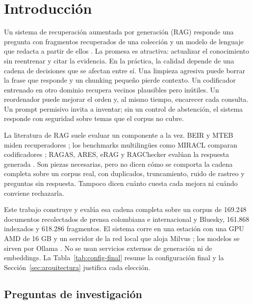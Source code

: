 \section{Introducci\'on}
\label{sec:intro}

Un sistema de recuperaci\'on aumentada por generaci\'on (RAG) responde una pregunta con fragmentos recuperados de una colecci\'on y un modelo de lenguaje que redacta a partir de ellos \cite{lewis2020rag}. La promesa es atractiva: actualizar el conocimiento sin reentrenar y citar la evidencia. En la pr\'actica, la calidad depende de una cadena de decisiones que se afectan entre s\'i. Una limpieza agresiva puede borrar la frase que responde y un chunking peque\~no pierde contexto. Un codificador entrenado en otro dominio recupera vecinos plausibles pero in\'utiles. Un reordenador puede mejorar el orden y, al mismo tiempo, encarecer cada consulta. Un prompt permisivo invita a inventar; sin un control de abstenci\'on, el sistema responde con seguridad sobre temas que el corpus no cubre.

La literatura de RAG suele evaluar un componente a la vez. BEIR y MTEB miden recuperadores \cite{thakur2021beir,muennighoff2023mteb}; los benchmarks multiling\"ues como MIRACL comparan codificadores \cite{zhang2023miracl}; RAGAS, ARES, eRAG y RAGChecker eval\'uan la respuesta generada \cite{es2023ragas,saadfalcon2024ares,salemi2024erag,ru2024ragchecker}. Son piezas necesarias, pero no dicen c\'omo se comporta la cadena completa sobre un corpus real, con duplicados, truncamiento, ruido de rastreo y preguntas sin respuesta. Tampoco dicen cu\'anto cuesta cada mejora ni cu\'ando conviene rechazarla.

Este trabajo construye y eval\'ua esa cadena completa sobre un corpus de 169.248 documentos recolectados de prensa colombiana e internacional y Bluesky, 161.868 indexados y 618.286 fragmentos. El sistema corre en una estaci\'on con una GPU AMD de 16 GB y un servidor de la red local que aloja Milvus \cite{milvusdocs}; los modelos se sirven por Ollama \cite{ollamadocs}. No se usan servicios externos de generaci\'on ni de embeddings. La Tabla~\ref{tab:config-final} resume la configuraci\'on final y la Secci\'on~\ref{sec:arquitectura} justifica cada elecci\'on.

\subsection{Preguntas de investigaci\'on}

